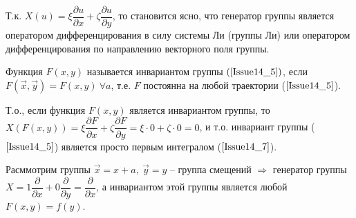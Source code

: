 Т.к. $X(u) = \xi \dfrac{\partial u}{\partial x} + \zeta \dfrac{\partial u}{\partial y}$, то становится ясно, что генератор группы является оператором дифференцирования в силу системы Ли (группы Ли) или оператором дифференцирования по направлению векторного поля группы.

\begin{definition}
	Функция $F(x,y)$ называется $\textbf{инвариантом группы}$ $(\ref{Issue14_5})$, если \
	$F(\vec{x}, \vec{y}) = F(x,y)\  \forall a$, т.е. $F$ постоянна на любой траектории ($\ref{Issue14_5}$).
\end{definition}


Т.о., если функция $F(x,y)$ является инвариантом группы, то $X(F(x,y)) = \xi \dfrac{\partial F}{\partial x} + \zeta \dfrac{\partial F}{\partial y} = \xi \cdot 0 + \zeta \cdot 0 = 0$, и т.о. инвариант группы ($\ref{Issue14_5}$) является просто первым интегралом ($\ref{Issue14_7}$).

Расммотрим группы $\vec{x} = x + a,\ \vec{y} = y$ -- группа смещений $\Rightarrow$ генератор группы $X = 1 \dfrac{\partial}{\partial x} + 0 \dfrac{\partial}{\partial y} = \dfrac{\partial}{\partial x}$, а инвариантом этой группы является любой $F(x,y) = f(y)$.

